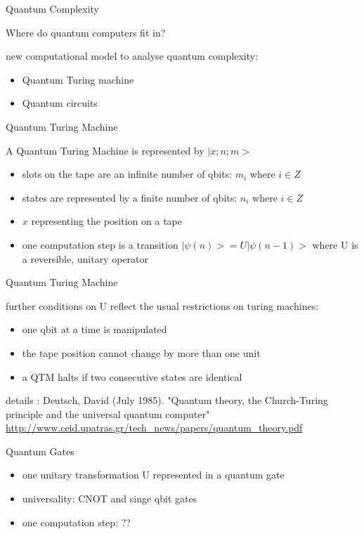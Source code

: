 \documentclass[c]{beamer}
\begin{document}
\begin{frame}{Quantum Complexity}

Where do quantum computers fit in?

new computational model to analyse quantum complexity:
\begin{itemize}
\item Quantum Turing machine
\item Quantum circuits
\end{itemize}

\end{frame}

\begin{frame}{Quantum Turing Machine}

A Quantum Turing Machine is represented by $|x;n;m>$
\begin{itemize}
\item slots on the tape are an infinite number of qbits: $m_i$ where $i \in Z$ 
\item states are represented by a finite number of qbits: $n_i$ where $i \in Z$
\item $x$ representing the position on a tape
\item one computation step is a transition $|\psi(n)> = U|\psi(n-1)>$ where
U is a reversible, unitary operator

\end{itemize}

\end{frame}

\begin{frame}{Quantum Turing Machine}

further conditions on U reflect the usual restrictions on turing machines: 
\begin{itemize}
\item one qbit at a time is manipulated
\item the tape position cannot change by more than one unit
\item a QTM halts if two consecutive states are identical 
\end{itemize}
\medskip
\begin{footnotesize}
details : Deutsch, David (July 1985). "Quantum theory, the Church-Turing principle and the universal quantum computer"
\url{http://www.ceid.upatras.gr/tech_news/papers/quantum_theory.pdf}
\end{footnotesize}

\end{frame}

\begin{frame}{Quantum Gates}
\begin{itemize}
\item one unitary transformation U represented in a quantum gate
\item universality: CNOT and singe qbit gates
\item one computation step: ??
\end{itemize}
\end{frame}
\end{document}
